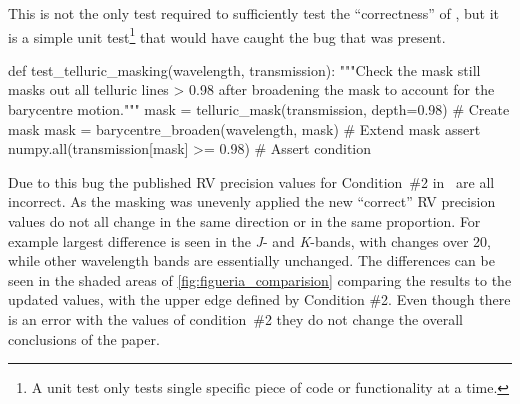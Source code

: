 This is not the only test required to sufficiently test the ``correctness'' of , but it is a simple unit test\footnote{A unit test only tests  single specific piece of code or functionality at a time.} that would have caught the bug that was present.
\begin{python}[caption={Example unit test to catch the masking bug.\ The assert statement checks that the mask continues to remove all telluric lines deeper than 2\%.}, label={lst:masking_unit_test}]
def test_telluric_masking(wavelength, transmission):
    """Check the mask still masks out all telluric lines > 0.98 after
    broadening the mask to account for the barycentre motion."""
    mask = telluric_mask(transmission, depth=0.98)  # Create mask
    mask = barycentre_broaden(wavelength, mask)     # Extend mask
    assert numpy.all(transmission[mask] >= 0.98)    # Assert condition
\end{python}
Due to this bug the published {RV} precision values for Condition~\#2  in~\citet{figueira_radial_2016} are all incorrect.
As the masking was unevenly applied the new ``correct'' {RV} precision values do not all change in the same direction or in the same proportion.
For example largest difference is seen in the \emph{J}- and \emph{K}-bands, with changes over 20\mps{}, while other wavelength bands are essentially unchanged.
The differences can be seen in the shaded areas of \cref{fig:figueria_comparision} comparing the \citet{figueira_radial_2016} results to the updated values, with the upper edge defined by Condition \#2.
Even though there is an error with the values of condition~\#2 they do not change the overall conclusions of the paper.
